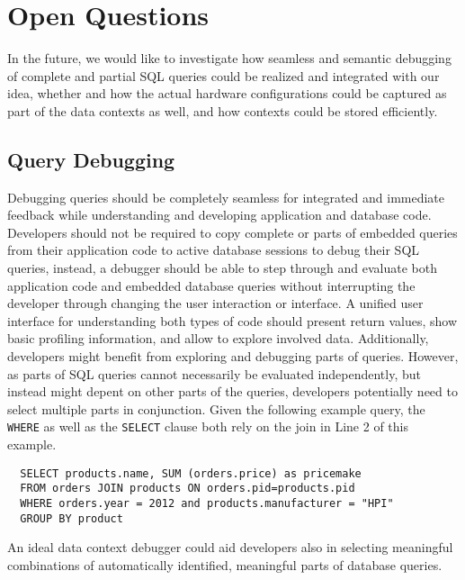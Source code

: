 \section{Open Questions} \label{sec:OPEN_QUESTIONS}
In the future, we would like to investigate how seamless and semantic debugging of complete and partial SQL queries could be realized and integrated with our idea, whether and how the actual hardware configurations could be captured as part of the data contexts as well, and how contexts could be stored efficiently.

\subsection{Query Debugging}
Debugging queries should be completely seamless for integrated and immediate feedback while understanding and developing application and database code.
Developers should not be required to copy complete or parts of embedded queries from their application code to active database sessions to debug their SQL queries, instead, a debugger should be able to step through and evaluate both application code and embedded database queries without interrupting the developer through changing the user interaction or interface.
A unified user interface for understanding both types of code should present return values, show basic profiling information, and allow to explore involved data.
Additionally, developers might benefit from exploring and debugging parts of queries.
However, as parts of SQL queries cannot necessarily be evaluated independently, but instead might depent on other parts of the queries, developers potentially need to select multiple parts in conjunction.
Given the following example query, the \texttt{WHERE} as well as the \texttt{SELECT} clause both rely on the join in Line 2 of this example.
\lstset{language=SQL}
\begin{lstlisting}
  SELECT products.name, SUM (orders.price) as pricemake
  FROM orders JOIN products ON orders.pid=products.pid
  WHERE orders.year = 2012 and products.manufacturer = "HPI"
  GROUP BY product
\end{lstlisting}
An ideal data context debugger could aid developers also in selecting meaningful combinations of automatically identified, meaningful parts of database queries.

